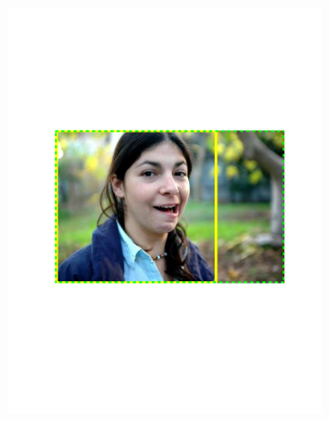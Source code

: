 \begin{figure}[hbt]
\begin{subfigure}[b]{0.45\textwidth}
        \includegraphics[width=\textwidth]{TP43}
        \caption{}
        \label{fig:dettp2}
    \end{subfigure}
    

\end{figure}
